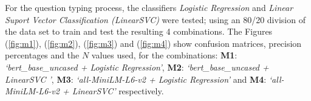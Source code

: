 For the question typing process, the classifiers \emph{Logistic Regression} and \emph{Linear Suport Vector Classification (LinearSVC)} were tested; using an 80/20 division of the data set to train and test the resulting 4 combinations. The Figures (\ref{fig:m1}), (\ref{fig:m2}), (\ref{fig:m3}) and (\ref{fig:m4}) show confusion matrices, precision percentages and the $N$ values used, for the combinations: \textbf{M1}: \emph{`bert\_base\_uncased + Logistic Regression'}, \textbf{M2}: \emph{`bert\_base\_uncased + LinearSVC '}, \textbf{M3}: \emph{`all-MiniLM-L6-v2 + Logistic Regression'} and \textbf{M4}: \emph{`all-MiniLM-L6-v2 + LinearSVC'} respectively.


